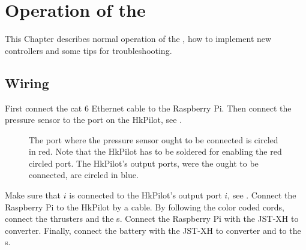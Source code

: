 \chapter{Operation of the \abbrROV} \label{app:operation}
This Chapter describes normal operation of the \abbrROV, how to implement new controllers and some tips for troubleshooting.

\section{Wiring} \label{sec:wiring}
First connect the cat 6 Ethernet cable to the Raspberry Pi. Then connect the pressure sensor to the \abbrIC port on the HkPilot, see .
\begin{figure}
\centering
{}
\caption{The \abbrIC port where the pressure sensor ought to be connected is circled in red. Note that the HkPilot has to be soldered for enabling the red circled \abbrIC port. The HkPilot's output ports, were the \abbrESC ought to be connected, are circled in blue.}
\label{fig:i2c}
\end{figure}
Make sure that \abbrESC $i$ is connected to the HkPilot's output port $i$, see . Connect the Raspberry Pi to the HkPilot by a \abbrUSB cable. By following the color coded cords, connect the thrusters and the \abbrESC{}s. Connect the Raspberry Pi with the JST-XH to \abbrUSB converter. Finally, connect the battery with the JST-XH to \abbrUSB converter and to the \abbrESC{}s.

